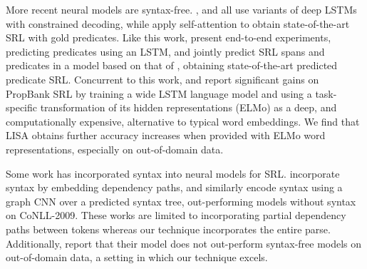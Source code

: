 \documentclass[11pt,a4paper]{article}
\begin{document}
More recent neural models are syntax-free. \citet{zhou2015end}, \citet{marcheggiani2017simple} and \citet{he2017deep} all use variants of deep LSTMs with constrained decoding, while \citet{tan2018deep} apply self-attention to obtain state-of-the-art SRL with gold predicates. Like this work, \citet{he2017deep} present end-to-end experiments, predicting predicates using an LSTM, and \citet{he2018jointly} jointly predict SRL spans and predicates in a model based on that of \citet{lee2017end}, obtaining state-of-the-art predicted predicate SRL. Concurrent to this work, \citet{peters2018deep} and \citet{he2018jointly} report significant gains on PropBank SRL by training a wide LSTM language model and using a task-specific transformation of its hidden representations (ELMo) as a deep, and computationally expensive, alternative to typical word embeddings. We find that LISA obtains further accuracy increases when provided with ELMo word representations, especially on out-of-domain data.

Some work has incorporated syntax into neural models for SRL. \citet{roth2016neural} incorporate syntax by embedding dependency paths, and similarly \citet{marcheggiani2017encoding} encode syntax using a graph CNN over a predicted syntax tree, out-performing models without syntax on CoNLL-2009. These works are limited to incorporating partial dependency paths between tokens whereas our technique incorporates the entire parse. Additionally, \citet{marcheggiani2017encoding} report that their model does not out-perform syntax-free models on out-of-domain data, a setting in which our technique excels.

\end{document}
